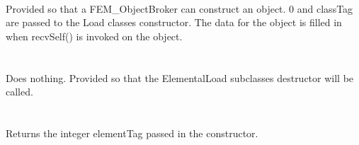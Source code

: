   \\
Provided so that a FEM\_ObjectBroker can construct an object. $0$ and
\p classTag are passed to the Load classes constructor. The data
for the object is filled in when recvSelf() is invoked on the
object.\\

 \\
\\ 
Does nothing. Provided so that the ElementalLoad subclasses destructor
will be called. \\

  \\
\indent{} \\
Returns the integer \p elementTag passed in the constructor. 

